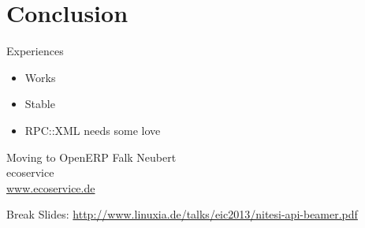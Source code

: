 \section{Conclusion}

\begin{frame}{Experiences}
\begin{itemize}
\item Works
\item Stable
\item RPC::XML needs some love
\end{itemize}
\end{frame}

\begin{frame}{Moving to OpenERP}
Falk Neubert \\
ecoservice \\
\url{www.ecoservice.de}
\end{frame}

\begin{frame}{Break}
Slides:
\url{http://www.linuxia.de/talks/eic2013/nitesi-api-beamer.pdf}
\end{frame}



